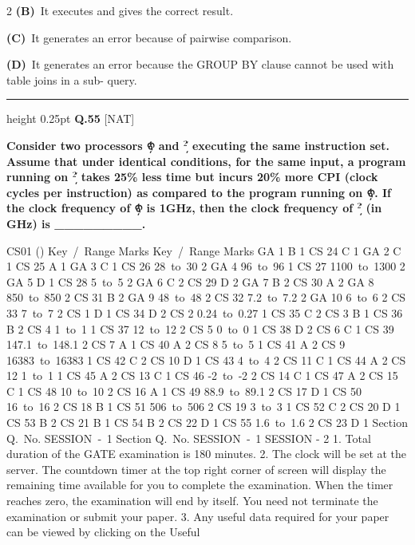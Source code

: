 \documentclass[a4paper,10pt,twoside]{article}
\begin{document}
\begin{multicols}{2}
\textbf{(B)}~It executes and gives the correct result.\par\vspace{2pt}\noindent
\textbf{(C)}~It generates an error because of pairwise comparison.\par\vspace{2pt}\noindent
\textbf{(D)}~It generates an error because the GROUP BY clause cannot be used with table joins in a sub- \newline query.
\par\vspace{6pt}\hrule height 0.25pt\vspace{6pt}
\noindent\textbf{Q.55} \hfill {\footnotesize\textsf{[NAT]}}
\par\vspace{2pt}
{\bfseries Consider two processors ܲଵ and ܲ$^2$ executing the same instruction set. Assume that under identical
conditions, for the same input, a program running on ܲ$^2$ takes 25\% less time but incurs 20\% more
CPI (clock cycles per instruction) as compared to the program running on ܲଵ. If the clock frequency
of ܲଵ is 1GHz, then the clock frequency of ܲ$^2$ (in GHz) is \_\_\_\_\_\_\_\_\_.
\par\smallskip
CS01 ()
Key / Range
Marks
Key / Range
Marks
GA
1
B
1
CS
24
C
1
GA
2
C
1
CS
25
A
1
GA
3
C
1
CS
26
28 to 30
2
GA
4
96 to 96
1
CS
27
1100 to 1300
2
GA
5
D
1
CS
28
5 to 5
2
GA
6
C
2
CS
29
D
2
GA
7
B
2
CS
30
A
2
GA
8
850 to 850
2
CS
31
B
2
GA
9
48 to 48
2
CS
32
7.2 to 7.2
2
GA
10
6 to 6
2
CS
33
7 to 7
2
CS
1
D
1
CS
34
D
2
CS
2
0.24 to 0.27
1
CS
35
C
2
CS
3
B
1
CS
36
B
2
CS
4
1 to 1
1
CS
37
12 to 12
2
CS
5
0 to 0
1
CS
38
D
2
CS
6
C
1
CS
39
147.1 to 148.1
2
CS
7
A
1
CS
40
A
2
CS
8
5 to 5
1
CS
41
A
2
CS
9
16383 to 16383
1
CS
42
C
2
CS
10
D
1
CS
43
4 to 4
2
CS
11
C
1
CS
44
A
2
CS
12
1 to 1
1
CS
45
A
2
CS
13
C
1
CS
46
‐2 to ‐2
2
CS
14
C
1
CS
47
A
2
CS
15
C
1
CS
48
10 to 10
2
CS
16
A
1
CS
49
88.9 to 89.1
2
CS
17
D
1
CS
50
16 to 16
2
CS
18
B
1
CS
51
506 to 506
2
CS
19
3 to 3
1
CS
52
C
2
CS
20
D
1
CS
53
B
2
CS
21
B
1
CS
54
B
2
CS
22
D
1
CS
55
1.6 to 1.6
2
CS
23
D
1
Section Q. No.
SESSION ‐ 1
Section Q. No.
SESSION ‐ 1
SESSION - 2
1. Total duration of the GATE examination is 180 minutes.
2. The clock will be set at the server. The countdown timer at the top right corner of
screen will display the remaining time available for you to complete the examination.
When the timer reaches zero, the examination will end by itself. You need not
terminate the examination or submit your paper.
3. Any useful data required for your paper can be viewed by clicking on the Useful
}
\end{multicols}
\end{document}
